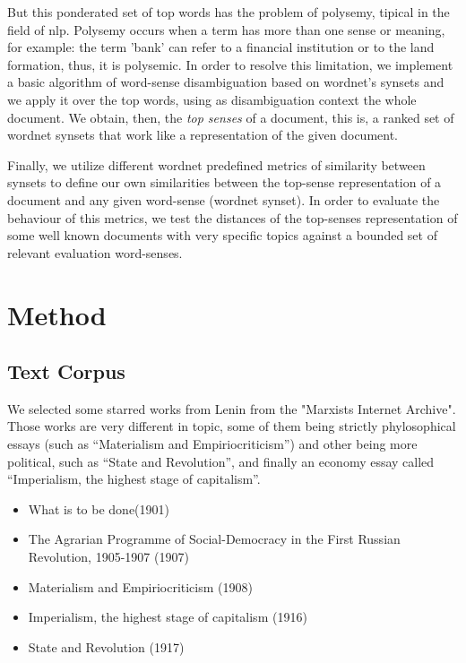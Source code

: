 \documentclass{pnastwo}
\begin{document}
\begin{article}
But this ponderated set of top words has the problem of polysemy, tipical in the field of nlp. Polysemy occurs when a term has more than one sense or meaning, for example: the term 'bank' can refer to a financial institution or to the land formation, thus, it is polysemic. In order to resolve this limitation, we implement a basic algorithm of word-sense disambiguation based on wordnet's synsets and we apply it over the top words, using as disambiguation context the whole document. We obtain, then, the \textit{top senses} of a document, this is, a ranked set of wordnet synsets that work like a representation of the given document.

Finally, we utilize different wordnet predefined metrics of similarity between synsets to define our own similarities between the top-sense representation of a document and any given word-sense (wordnet synset). In order to evaluate the behaviour of this metrics, we test the distances of the top-senses representation of some well known documents with very specific topics against a bounded set of relevant evaluation word-senses. 


\section{Method}
\subsection{Text Corpus}

We selected some starred works from Lenin from the "Marxists Internet Archive"\cite{LENIN}. Those works are very different in topic, some of them being strictly phylosophical essays (such as ``Materialism and Empiriocriticism'') and other being more political, such as ``State and Revolution'', and finally an economy essay called ``Imperialism, the highest stage of capitalism''. 

\begin{itemize}
  \item What is to be done(1901)
  \item The Agrarian Programme of Social-Democracy in the First Russian Revolution, 1905-1907 (1907)
  \item Materialism and Empiriocriticism (1908)
  \item Imperialism, the highest stage of capitalism (1916)
  \item State and Revolution (1917)
\end{itemize}


\end{article}
\end{document}
